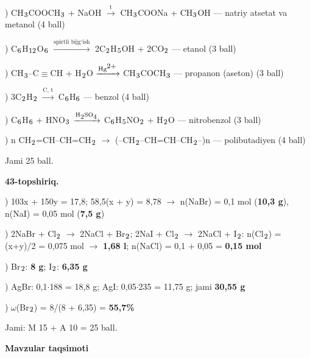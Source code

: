 \documentclass[11pt,a4paper]{article}
\renewcommand{\textsubscript}[1]{\ensuremath{_{\text{\fontsize{8}{8}\selectfont #1}}}}
\renewcommand{\textsuperscript}[1]{\ensuremath{^{\text{\fontsize{8}{8}\selectfont #1}}}}
\begin{document}
) CH\textsubscript{3}COOCH\textsubscript{3} + NaOH $\xrightarrow{\text{t}}$ CH\textsubscript{3}COONa + CH\textsubscript{3}OH --- natriy atsetat va metanol (4 ball)\par
{}) C\textsubscript{6}H\textsubscript{12}O\textsubscript{6} $\xrightarrow{\text{spirtli bijg`ish}}$ 2C\textsubscript{2}H\textsubscript{5}OH + 2CO\textsubscript{2} --- etanol (3 ball)\par
{}) CH\textsubscript{3}--C$\equiv$CH + H\textsubscript{2}O $\xrightarrow{\text{Hg\textsuperscript{2+}}}$ CH\textsubscript{3}COCH\textsubscript{3} --- propanon (aseton) (3 ball)\par
{}) 3C\textsubscript{2}H\textsubscript{2} $\xrightarrow{\text{C, t}}$ C\textsubscript{6}H\textsubscript{6} --- benzol (4 ball)\par
{}) C\textsubscript{6}H\textsubscript{6} + HNO\textsubscript{3} $\xrightarrow{\text{H\textsubscript{2}SO\textsubscript{4}}}$ C\textsubscript{6}H\textsubscript{5}NO\textsubscript{2} + H\textsubscript{2}O --- nitrobenzol (3 ball)\par
{}) n CH\textsubscript{2}=CH--CH=CH\textsubscript{2} $\to$ (--CH\textsubscript{2}--CH=CH--CH\textsubscript{2}--)n --- polibutadiyen (4 ball)\par
\noindent Jami 25 ball.\par
\noindent\textbf{43-topshiriq.}\par
{}) 103x + 150y = 17,8; 58,5(x + y) = 8,78 $\to$ n(NaBr) = 0,1 mol (\textbf{10,3 g}), n(NaI) = 0,05 mol (\textbf{7,5 g})\par
{}) 2NaBr + Cl\textsubscript{2} $\to$ 2NaCl + Br\textsubscript{2}; 2NaI + Cl\textsubscript{2} $\to$ 2NaCl + I\textsubscript{2}: n(Cl\textsubscript{2}) = (x+y)/2 = 0,075 mol $\to$ \textbf{1,68 l}; n(NaCl) = 0,1 + 0,05 = \textbf{0,15 mol}\par
{}) Br\textsubscript{2}: \textbf{8 g}; I\textsubscript{2}: \textbf{6,35 g}\par
{}) AgBr: 0,1$\cdot$188 = 18,8 g; AgI: 0,05$\cdot$235 = 11,75 g; jami \textbf{30,55 g}\par
{}) $\omega$(Br\textsubscript{2}) = 8/(8 + 6,35) = \textbf{55,7\%}\par
\noindent Jami: M 15 + A 10 = 25 ball.\par
\par\bigskip\noindent\textbf{Mavzular taqsimoti}\par\smallskip
\end{document}
